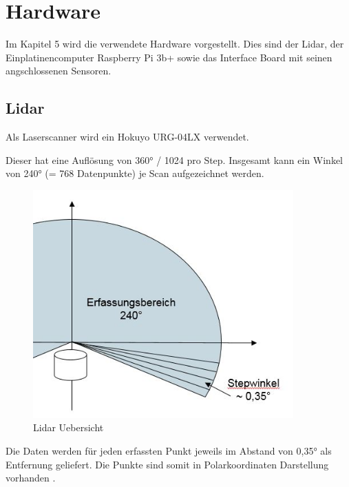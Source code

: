 \chapter{Hardware}

Im Kapitel 5 wird die verwendete Hardware vorgestellt. Dies sind der Lidar, der Einplatinencomputer Raspberry Pi 3b+ sowie das Interface Board mit seinen angschlossenen Sensoren. 

\section{Lidar}

Als Laserscanner wird ein Hokuyo URG-04LX verwendet.

Dieser hat eine Auflösung von 360° / 1024 pro Step. Insgesamt kann ein Winkel von 240° (= 768 Datenpunkte) je Scan aufgezeichnet werden.

\begin{figure}[h]
\begin{center}
\includegraphics[width=10cm]{images/chapter5/LidarHardware.JPG}
\caption{Lidar Uebersicht}
\label{Lidar_uebersicht}
\end{center}
\end{figure}

Die Daten werden für jeden erfassten Punkt jeweils im Abstand von 0,35° als Entfernung geliefert. Die Punkte sind somit in Polarkoordinaten Darstellung vorhanden \cite{hokuyo.2018}.

